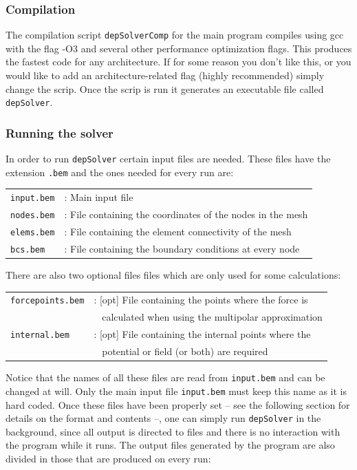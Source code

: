 \documentclass[12pt]{article}
\begin{document}
\subsubsection*{Compilation}
The compilation script \verb+depSolverComp+ for the main program compiles using gcc with the flag -O3 and several other performance optimization flags. This produces the fastest code for any architecture. If for some reason you don't like this, or you would like to add an architecture-related flag (highly recommended) simply change the scrip. Once the scrip is run it generates an executable file called \verb+depSolver+.

\subsubsection*{Running the solver}
In order to run \verb+depSolver+ certain input files are needed. These files have the extension \verb+.bem+ and the ones needed for every run are:

\begin{tabular}{ll}
\texttt{input.bem}&: Main input file\\
\texttt{nodes.bem}&: File containing the coordinates of the nodes in the mesh\\
\texttt{elems.bem}&: File containing the element connectivity of the mesh\\
\texttt{bcs.bem}&: File containing the boundary conditions at every node
\end{tabular}

There are also two optional files files which are only used for some calculations: 

\begin{tabular}{ll}
\texttt{forcepoints.bem}&: [opt] File containing the points where the force is\\
  & \verb+ + calculated when using the multipolar approximation\\
\texttt{internal.bem}&: [opt] File containing the internal points where the\\
  & \verb+ + potential or field (or both) are required
\end{tabular}

Notice that the names of all these files are read from \verb+input.bem+ and can be changed at will. Only the main input file \verb+input.bem+ must keep this name as it is hard coded. Once these files have been properly set -- see the following section for details on the format and contents --, one can simply run \verb+depSolver+ in the background, since all output is directed to files and there is no interaction with the program while it runs. The output files generated by the program are also divided in those that are produced on every run:
\end{document}
